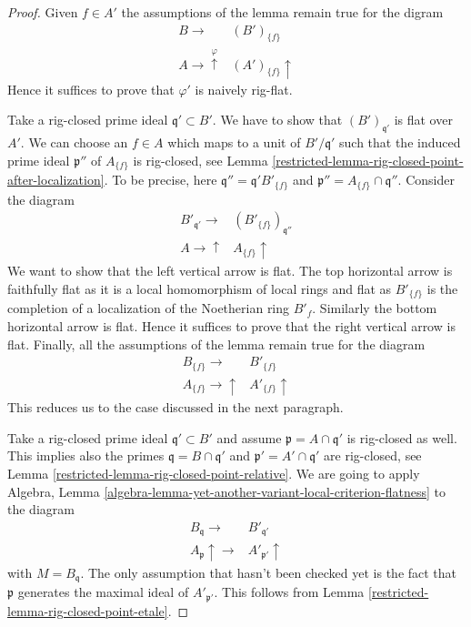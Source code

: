 \begin{proof}

Given $f \in A'$ the assumptions of the lemma remain true for the digram
$$
\begin{array}{cc}B \longrightarrow & (B')_{\{f\}} \\ A \longrightarrow\overset{\varphi}{\uparrow} & (A')_{\{f\}} \uparrow\end{array}
$$
Hence it suffices to prove that $\varphi'$ is naively rig-flat.

\medskip\noindent
Take a rig-closed prime ideal $\mathfrak q' \subset B'$.
We have to show that $(B')_{\mathfrak q'}$ is flat over $A'$.
We can choose an $f \in A$ which maps to a unit of $B'/\mathfrak q'$
such that the induced prime ideal $\mathfrak p''$ of $A_{\{f\}}$
is rig-closed, see Lemma \ref{restricted-lemma-rig-closed-point-after-localization}.
To be precise, here $\mathfrak q'' = \mathfrak q' B'_{\{f\}}$ and
$\mathfrak p'' = A_{\{f\}} \cap \mathfrak q''$.
Consider the diagram
$$
\begin{array}{cc}B'_{\mathfrak q'} \longrightarrow & (B'_{\{f\}})_{\mathfrak q''} \\ A \longrightarrow\uparrow & A_{\{f\}} \uparrow\end{array}
$$
We want to show that the left vertical arrow is flat.
The top horizontal arrow is faithfully flat as it is a local
homomorphism of local rings and flat as $B'_{\{f\}}$
is the completion of a localization of the Noetherian ring
$B'_f$. Similarly the bottom horizontal arrow is flat.
Hence it suffices to prove that the right vertical arrow is flat.
Finally, all the assumptions of the lemma remain true for the diagram
$$
\begin{array}{cc}B_{\{f\}} \longrightarrow & B'_{\{f\}} \\ A_{\{f\}} \longrightarrow\uparrow & A'_{\{f\}} \uparrow\end{array}
$$
This reduces us to the case discussed in the next paragraph.

\medskip\noindent
Take a rig-closed prime ideal $\mathfrak q' \subset B'$
and assume $\mathfrak p = A \cap \mathfrak q'$ is rig-closed as well.
This implies also the primes $\mathfrak q = B \cap \mathfrak q'$
and $\mathfrak p' = A' \cap \mathfrak q'$ are rig-closed, see
Lemma \ref{restricted-lemma-rig-closed-point-relative}.
We are going to apply
Algebra, Lemma \ref{algebra-lemma-yet-another-variant-local-criterion-flatness}
to the diagram
$$
\begin{array}{cc}B_\mathfrak q \longrightarrow & B'_{\mathfrak q'} \\ A_\mathfrak p \uparrow\longrightarrow & A'_{\mathfrak p'} \uparrow\end{array}
$$
with $M = B_\mathfrak q$. The only assumption that hasn't been checked yet
is the fact that $\mathfrak p$ generates the maximal ideal of
$A'_{\mathfrak p'}$. This follows from
Lemma \ref{restricted-lemma-rig-closed-point-etale}.
\end{proof}

